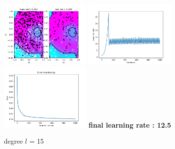 \documentclass[a4paper]{article}
\begin{document}
\begin{figure}[h]
	\includegraphics[width=0.4\textwidth]{logreg_deg15_iter2000.png}
	\includegraphics[width=0.4\textwidth]{logreg_deg15_iter2000_learn.png}
	\includegraphics[width=0.4\textwidth]{logreg_deg15_iter2000_error.png}
	\textbf{final learning rate : 12.5}
	\caption{degree $l$ = 15}
\end{figure}
\clearpage
\end{document}
